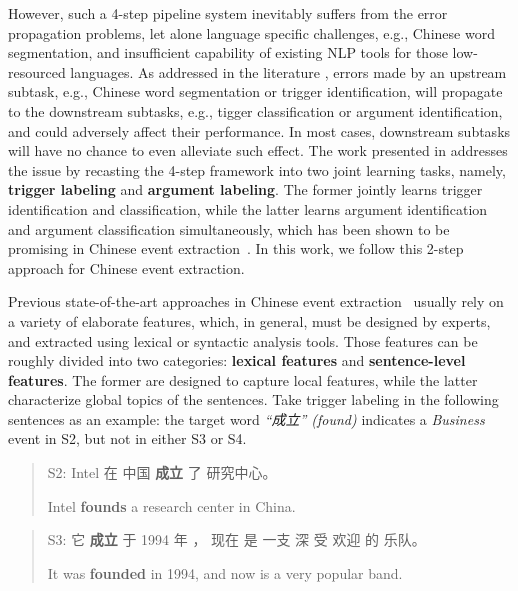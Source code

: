 However, such a 4-step pipeline system inevitably suffers from the error propagation problems, let alone language specific challenges,  e.g., Chinese word segmentation, and insufficient capability of existing NLP tools for those low-resourced languages.  As addressed in the literature \cite{chen2009language,li2012employing}, errors made by an upstream subtask, e.g., Chinese word segmentation or trigger identification,  will propagate to the downstream subtasks, e.g., tigger classification or argument identification, and could adversely affect their performance. In most cases, downstream subtasks will have no chance to even alleviate such effect. The work presented in \cite{chen2012joint} addresses the issue by recasting the 4-step framework  into two joint learning tasks, namely, \textbf{trigger labeling} and \textbf{argument labeling}. The  former jointly learns trigger identification and classification, while the latter learns argument identification and argument classification simultaneously, which has been shown to be promising in Chinese event extraction~\cite{chen2012joint}. In this work, we follow this 2-step approach for Chinese event extraction. 


Previous state-of-the-art approaches in Chinese event extraction~\cite{chen2009language,li2012employing,chen2012joint,li2013joint} usually rely on a variety of elaborate features, which, in general, must be designed by experts, and extracted using lexical or syntactic analysis tools. Those features can be roughly divided into two categories: \textbf{lexical features} and \textbf{sentence-level features}. The former are designed to capture local features, while the latter characterize global topics of the sentences.  Take trigger labeling in the following sentences as an example: the target word \textit{``成立'' (found)} indicates a \emph{Business} event in S2, but not in either S3 or S4.

\begin{quote}
S2: Intel 在 中国 \textbf{成立} 了 研究中心。

\hspace{0.52cm} Intel \textbf{founds} a research center in China.
\end{quote}

\begin{quote}
S3: 它 \textbf{成立} 于 1994 年 ， 现在 是 一支 深 受 欢迎 的 乐队。

\hspace{0.52cm} It was \textbf{founded} in 1994, and now is a very popular band.
\end{quote}

